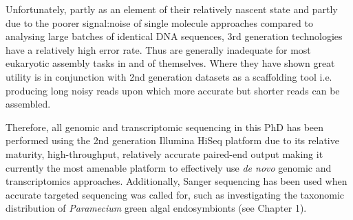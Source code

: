 Unfortunately, partly as an element of their relatively nascent state and partly due to the
poorer signal:noise of single molecule approaches compared to analysing large 
batches of identical DNA sequences, 3rd generation technologies have a relatively high error rate.
Thus are generally inadequate for most eukaryotic assembly tasks in and of themselves.
Where they have shown great utility is in conjunction with 2nd generation datasets
as a scaffolding tool i.e. producing long noisy reads upon which more accurate but shorter
reads can be assembled.


Therefore, all genomic and transcriptomic sequencing in this PhD has been performed using the 2nd generation
Illumina HiSeq platform due to its relative maturity, high-throughput, relatively accurate
paired-end output making it currently the most amenable platform to effectively
use \textit{de novo} genomic and transcriptomics approaches.  Additionally, Sanger sequencing
has been used when accurate targeted sequencing was called for, such as investigating the
taxonomic distribution of \textit{Paramecium} green algal endosymbionts (see Chapter 1).


%
%
%
%
%
%
%
%
%
%
%
%
%
%
%
%
%
%
%
%
%


